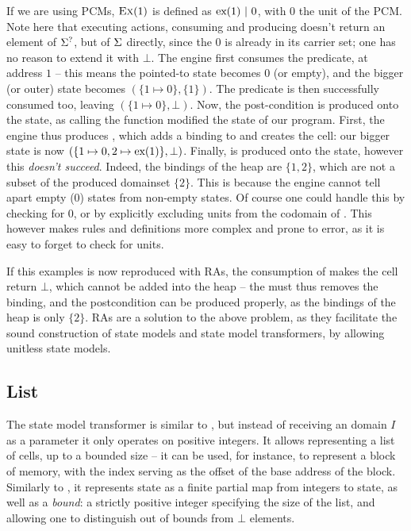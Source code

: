 If we are using PCMs, $\textsc{Ex}({1})$ is defined as $\text{ex}(1)~|~0$, with $0$ the unit of the PCM. Note here that executing actions, consuming and producing doesn't return an element of $\Sigma^?$, but of $\Sigma$ directly, since the $0$ is already in its carrier set; one has no reason to extend it with $\bot$. The engine first consumes the \exP{} predicate, at address $1$ -- this means the pointed-to state becomes $0$ (or empty), and the bigger (or outer) state becomes $(\{ 1\mapsto 0\}, \{ 1\})$. The \domainset{} predicate is then successfully consumed too, leaving $(\{ 1\mapsto 0\},\bot)$. Now, the post-condition is produced onto the state, as calling the function modified the state of our program. First, the engine thus produces , which adds a binding to \PMap{} and creates the cell: our bigger state is now $(\{ 1\mapsto 0, 2\mapsto \text{ex}(1)\},\bot)$. Finally,  is produced onto the state, however this \emph{doesn't succeed}. Indeed, the bindings of the heap are $\{1,2\}$, which are not a subset of the produced domainset $\{2\}$. This is because the engine cannot tell apart empty ($0$) states from non-empty states. Of course one could handle this by checking for $0$, or by explicitly excluding units from the codomain of \PMap{}. This however makes rules and definitions more complex and prone to error, as it is easy to forget to check for units.

If this examples is now reproduced with RAs, the consumption of  makes the cell return $\bot$, which cannot be added into the heap -- the \PMap{} must thus removes the binding, and the postcondition can be produced properly, as the bindings of the heap is only $\{2\}$. RAs are a solution to the above problem, as they facilitate the sound construction of state models and state model transformers, by allowing unitless state models.

\subsection{List}

The \List{} state model transformer is similar to \PMap, but instead of receiving an domain $I$ as a parameter it only operates on positive integers. It allows representing a list of cells, up to a bounded size -- it can be used, for instance, to represent a block of memory, with the index serving as the offset of the base address of the block. Similarly to \PMap{}, it represents state as a finite partial map from integers to state, as well as a \emph{bound}: a strictly positive integer specifying the size of the list, and allowing one to distinguish out of bounds from $\bot$ elements.

